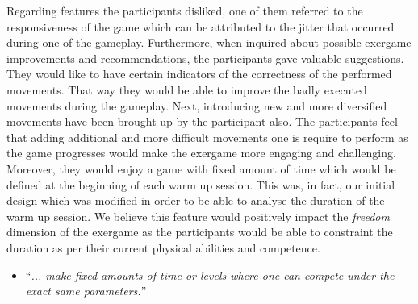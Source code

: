 Regarding features the participants disliked, one of them referred to the responsiveness of the game which can be attributed to the jitter that occurred during one of the gameplay. Furthermore, when inquired about possible exergame improvements and recommendations, the participants gave valuable suggestions. They would like to have certain indicators of the correctness of the performed movements. That way they would be able to improve the badly executed movements during the gameplay. Next, introducing new and more diversified movements have been brought up by the participant also. The participants feel that adding additional and more difficult movements one is require to perform as the game progresses would make the exergame more engaging and challenging. Moreover, they would enjoy a  game with fixed amount of time which would be defined at the beginning of each warm up session. This was, in fact, our initial design which was modified in order to be able to analyse the duration of the warm up session. We believe this feature would positively impact the \textit{freedom} dimension of the exergame as the participants would be able to constraint the duration as per their current physical abilities and competence.
\begin{itemize}
\item ``\textit{... make fixed amounts of time or levels where one can compete under the exact same parameters.}''
\end{itemize}
